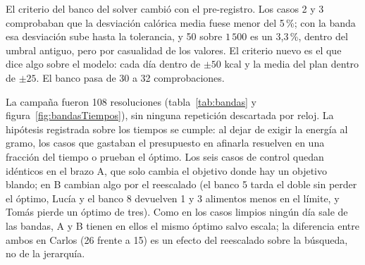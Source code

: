 El criterio del banco del solver cambió con el pre-registro. Los casos 2 y 3 comprobaban que la desviación calórica media fuese menor del 5\,\%; con la banda esa desviación sube hasta la tolerancia, y 50 sobre $1\,500$ es un 3,3\,\%, dentro del umbral antiguo, pero por casualidad de los valores. El criterio nuevo es el que dice algo sobre el modelo: cada día dentro de $\pm 50$ kcal y la media del plan dentro de $\pm 25$. El banco pasa de 30 a 32 comprobaciones.

La campaña fueron 108 resoluciones (tabla~\ref{tab:bandas} y figura~\ref{fig:bandasTiempos}), sin ninguna repetición descartada por reloj. La hipótesis registrada sobre los tiempos se cumple: al dejar de exigir la energía al gramo, los casos que gastaban el presupuesto en afinarla resuelven en una fracción del tiempo o prueban el óptimo. Los seis casos de control quedan idénticos en el brazo A, que solo cambia el objetivo donde hay un objetivo blando; en B cambian algo por el reescalado (el banco 5 tarda el doble sin perder el óptimo, Lucía y el banco 8 devuelven 1 y 3 alimentos menos en el límite, y Tomás pierde un óptimo de tres). Como en los casos limpios ningún día sale de las bandas, A y B tienen en ellos el mismo óptimo salvo escala; la diferencia entre ambos en Carlos (26 frente a 15) es un efecto del reescalado sobre la búsqueda, no de la jerarquía.

